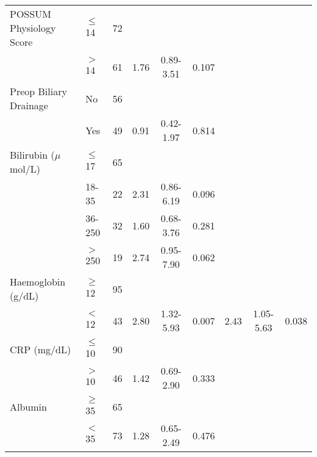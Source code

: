 \begin{sidewaystable}[p]
\begin{tabular}{|l l c| c c c| c c c|}
		POSSUM Physiology Score & $\leq$ 14 & 72     &      &           &            &      &           &  \\
		                        & $>$ 14    & 61     & 1.76 & 0.89-3.51 & 0.107      &      &           &  \\
		Preop Biliary Drainage  & No        & 56     &      &           &            &      &           &  \\
		                        & Yes       & 49     & 0.91 & 0.42-1.97 & 0.814      &      &           &  \\
		Bilirubin ($\mu$mol/L)  & $\leq$ 17 & 65     &      &           &            &      &           &  \\
		                        & 18-35     & 22     & 2.31 & 0.86-6.19 & 0.096      &      &           &  \\
		                        & 36-250    & 32     & 1.60 & 0.68-3.76 & 0.281      &      &           &  \\
		                        & $>$ 250   & 19     & 2.74 & 0.95-7.90 & 0.062      &      &           &  \\
		Haemoglobin (g/dL)      & $\geq$ 12 & 95     &      &           &            &      &           &  \\
		                        & $<$ 12    & 43     & 2.80 & 1.32-5.93 & 0.007      & 2.43 & 1.05-5.63 & 0.038      \\
		CRP (mg/dL)             & $\leq$ 10 & 90     &      &           &            &      &           &  \\
		                        & $>$ 10    & 46     & 1.42 & 0.69-2.90 & 0.333      &      &           &  \\
		Albumin                 & $\geq$ 35 & 65     &      &           &            &      &           &  \\
		                        & $<$ 35    & 73     & 1.28 & 0.65-2.49 & 0.476      &      &           &  \\ \hline
	\end{tabular}
\end{sidewaystable}